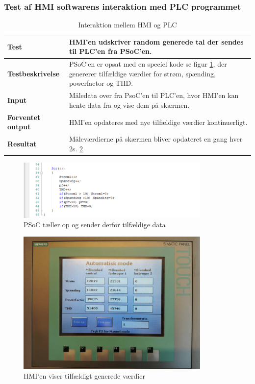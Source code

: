 \subsubsection{Test af HMI softwarens interaktion med PLC programmet}
\begin{table}[H]
	\centering
	\begin{tabular}{ | m{} | m{}|} 
		\hline
		\textbf{Test}					&HMI'en udskriver random generede tal der sendes til PLC'en fra PSoC'en. \\ \hline
		\textbf{Testbeskrivelse}		&PSoC'en er opsat med en speciel kode se figur \ref{fig:PSoCkodeeksempel}, der genererer tilfældige værdier for strøm, spænding, powerfactor og THD.  \\ \hline
		\textbf{Input}					& Måledata over fra PsoC'en til PLC'en, hvor HMI'en kan hente data fra og vise dem på skærmen.\\ \hline
		\textbf{Forventet output}		&HMI'en opdateres med nye tilfældige værdier kontinuerligt.\\ \hline
		\textbf{Resultat}				&Måleværdierne på skærmen bliver opdateret en gang hver 2s.  \ref{fig:HMItest}\\ \hline
	\end{tabular}
	\caption{Interaktion mellem HMI og PLC} 
	\label{tab:HMIogPLC}
\end{table}

\begin{figure}[H] %
	\centering
	\includegraphics[width=0.85\textwidth]{Test/ModultestStyringsenhed/PSoCkodeeksempel}
	\caption{PSoC tæller op og sender derfor tilfældige data}
	\label{fig:PSoCkodeeksempel}
\end{figure}

\begin{figure}[H] %
	\centering
	\includegraphics[width=0.85\textwidth]{Test/ModultestStyringsenhed/HMItest}
	\caption{HMI'en viser tilfældigt generede værdier}
	\label{fig:HMItest}
\end{figure}


